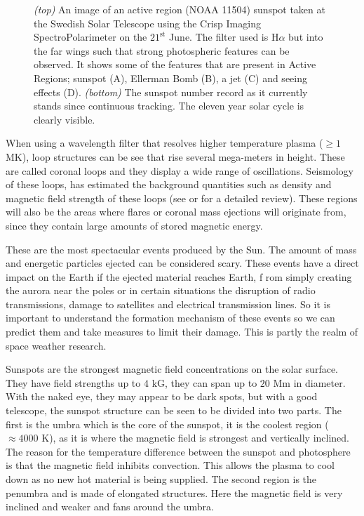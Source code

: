 \begin{figure}
\begin{subfigure}[b]{0.75\textwidth}
        \end{subfigure}
        \caption{
               \textit{(top)} An image of an active region (NOAA 11504) sunspot taken at the Swedish Solar Telescope using the Crisp Imaging SpectroPolarimeter on the $21^{\mathrm{st}}$ June. 
               The filter used is H$\alpha$ but into the far wings such that strong photospheric features can be observed.
               It shows some of the features that are present in Active Regions; sunspot (A), Ellerman Bomb (B), a jet (C) and seeing effects (D).            
               \textit{(bottom)} The sunspot number record as it currently stands since continuous tracking.  
               The eleven year solar cycle is clearly visible.
              }
        \label{fig:AR_Num}
     \end{figure}    
    
    When using a wavelength filter that resolves higher temperature plasma ($\ge1$ MK), loop structures can be see that rise several mega-meters in height.
    These are called coronal loops and they display a wide range of oscillations.
    Seismology of these loops, has estimated the background quantities such as density and magnetic field strength of these loops (see \cite{2005RSPTA.363.2743D} or \cite{Banerjee2007} for a detailed review). 
    These regions will also be the areas where flares or coronal mass ejections will originate from, since they contain large amounts of stored magnetic energy.

    These are the most spectacular events produced by the Sun.
    The amount of mass and energetic particles ejected can be considered scary. 
    These events have a direct impact on the Earth if the ejected material reaches Earth, f rom simply creating the aurora near the poles or in certain situations the disruption of radio transmissions, damage to satellites and electrical transmission lines.
    So it is important to understand the formation mechanism of these events so we can predict them and take measures to limit their damage.
    This is partly the realm of space weather research. 
    
    Sunspots are the strongest magnetic field concentrations on the solar surface.
    They have field strengths up to $4$ kG, they can span up to $20$ Mm in diameter.
    With the naked eye, they may appear to be dark spots, but with a good telescope, the sunspot structure can be seen to be divided into two parts.
    The first is the umbra which is the core of the sunspot, it is the coolest region ($\approx 4000$ K), as it is where the magnetic field is strongest and vertically inclined.
    The reason for the temperature difference between the sunspot and photosphere is that the magnetic field inhibits convection.
    This allows the plasma to cool down as no new hot material is being supplied.
    The second region is the penumbra and is made of elongated structures.
    Here the magnetic field is very inclined and weaker and fans around the umbra.

